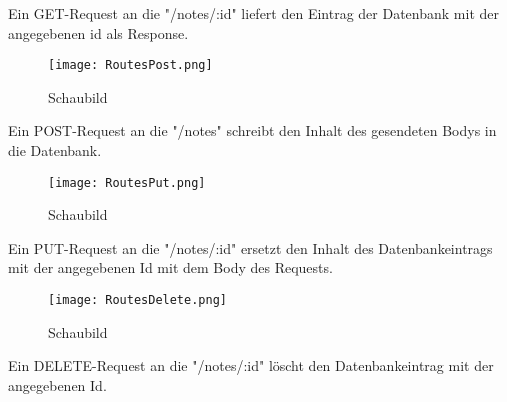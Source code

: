 Ein GET-Request an die "/notes/:id" liefert den Eintrag der Datenbank mit der angegebenen id als Response.

\begin{figure}[h]
\texttt{[image: RoutesPost.png]}
\vspace{3pt}
\caption{Schaubild\footnotemark}
\label{fig:blueant}
\end{figure}

Ein POST-Request an die "/notes" schreibt den Inhalt des gesendeten Bodys in die Datenbank.

\begin{figure}[h]
\texttt{[image: RoutesPut.png]}
\vspace{3pt}
\caption{Schaubild\footnotemark}
\label{fig:blueant}
\end{figure}

Ein PUT-Request an die "/notes/:id" ersetzt den Inhalt des Datenbankeintrags mit der angegebenen Id mit dem Body des Requests.

\begin{figure}[h]
\texttt{[image: RoutesDelete.png]}
\vspace{3pt}
\caption{Schaubild\footnotemark}
\label{fig:blueant}
\end{figure}

Ein DELETE-Request an die "/notes/:id" löscht den Datenbankeintrag mit der angegebenen Id.